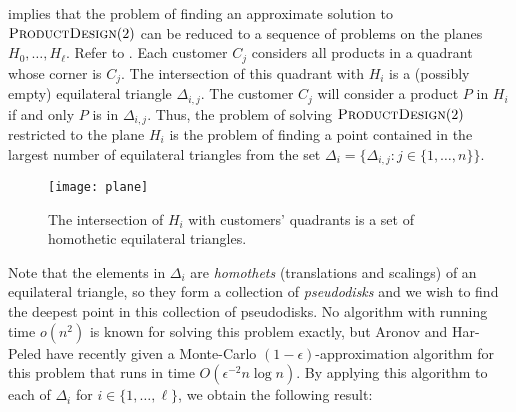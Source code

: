 \documentclass{llncs}
\newcommand{\ppu}{\operatorname{ppu}}
\newcommand{\val}{\operatorname{profit}}
\newcommand{\eps}{\epsilon}
\begin{document}

 implies that the problem of finding an approximate
solution to  $\textsc{ProductDesign}(2)$ can be reduced to a sequence of
problems on the planes $H_0,\ldots,H_\ell$.  Refer to . Each
customer $C_j$ considers all products in a quadrant whose corner is $C_j$.
The intersection of this quadrant with $H_i$ is a (possibly empty)
equilateral triangle $\Delta_{i,j}$.  The customer $C_j$ will consider
a product $P$ in $H_i$ if and only $P$ is in $\Delta_{i,j}$.  Thus,
the problem of solving $\textsc{ProductDesign}(2)$ restricted to the
plane $H_i$ is the problem of finding a point contained in the largest
number of equilateral triangles from the set $\Delta_i=\{\Delta_{i,j}:
j\in\{1,\ldots,n\}\}$.

\begin{figure}
  \begin{center}
    \texttt{[image: plane]}
  \end{center}
  \caption{The intersection of $H_i$ with customers' quadrants is a
          set of homothetic equilateral triangles.}
\end{figure}

Note that the elements in $\Delta_i$ are \emph{homothets} (translations and
scalings) of an equilateral triangle, so they form a collection of
\emph{pseudodisks} and we wish to find the deepest point in this collection
of pseudodisks.  No algorithm with running time $o(n^2)$ is known for
solving this problem exactly, but Aronov and Har-Peled \cite{ah08} have
recently given a Monte-Carlo $(1-\eps)$-approximation algorithm for this
problem that runs in time $O(\eps^{-2}n\log n)$.  By applying this
algorithm to each of $\Delta_i$ for $i\in\{1,\ldots,\ell\}$, we obtain the
following result:
\end{document}
